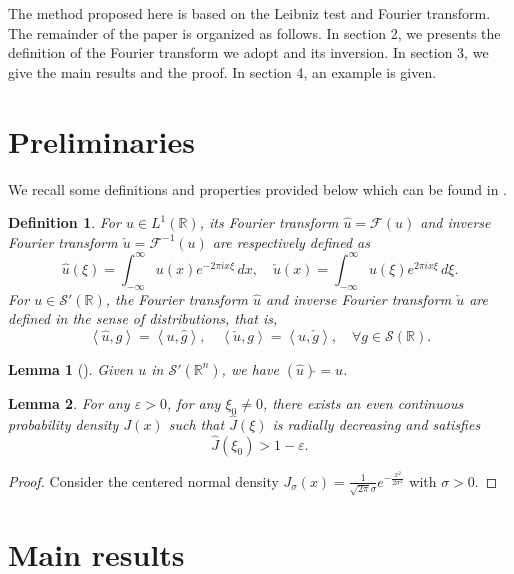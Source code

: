 \documentclass[12pt]{article}
\newtheorem{lemma}{Lemma}
\newtheorem{definition}{Definition}
\begin{document}
 The method proposed here is based on the Leibniz test and Fourier transform. The remainder of the paper is organized as follows. In section 2, we presents the definition of the Fourier transform we adopt and its inversion. In section 3, we give the main results and the proof. In section 4, an example is given. 

\section{Preliminaries}

We recall some definitions and properties provided below which can be found in \cite{Grafakos2008}.

\begin{definition}
	For \( u \in L^1(\mathbb{R}) \), its Fourier transform \(\hat{u}=\mathscr{F}(u)\) and inverse Fourier transform \(\check{u}=\mathscr{F}^{-1}(u)\) are respectively defined as  
	\[
	\hat{u}(\xi) = \int_{-\infty}^{\infty} u(x) e^{-2\pi i x\xi} \, dx,  
	\quad  
	\check{u}(x) = \int_{-\infty}^{\infty} u(\xi) e^{2\pi i x\xi} \, d\xi.
	\]
	For \( u \in \mathscr{S}'(\mathbb{R}) \), the Fourier transform \(\hat{u}\) and inverse Fourier transform \(\check{u}\) are defined in the sense of distributions, that is, 
	\[\left\langle {\hat u,g}\right\rangle = \left\langle {u,\hat g} \right\rangle ,\quad\left\langle {\check{u} ,g} \right\rangle  = \left\langle {u,\check g} \right\rangle ,\quad \forall g\in \mathscr{S}(\mathbb{R}).\]
\end{definition}


\begin{lemma}[\cite{Grafakos2008}]\label{lem1}
	Given \(u\) in \(\mathscr{S}'(\mathbb{R}^n)\), we have \((\hat{u})\check{ }=u\).
\end{lemma}

\begin{lemma}\label{lem2}
	For any $\varepsilon>0$, for any $\xi_0\neq0$, there exists an even continuous probability density $J(x)$ such that \(\hat{J}(\xi)\) is radially decreasing and satisfies
	\begin{equation*}
		\hat{J}(\xi_0)>1-\varepsilon.
	\end{equation*}
\end{lemma}
\begin{proof}
	Consider the centered normal density \( J_\sigma (x) = \frac{1}{\sqrt{2\pi}\sigma} e^{-\frac{x^2}{2\sigma^2}}\) with \(\sigma>0. \)
\end{proof}

\section{Main results}
\end{document}
